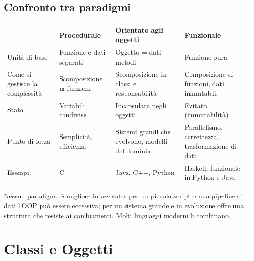 \subsection{Confronto tra paradigmi}
\begin{center}
\small
\begin{tabularx}{\textwidth}{@{}>{\raggedright\arraybackslash}p{2.4cm}XXX@{}}
\toprule
 & \textbf{Procedurale} & \textbf{Orientato agli oggetti} & \textbf{Funzionale} \\
\midrule
Unità di base & Funzione e dati separati & Oggetto = dati + metodi & Funzione pura \\
Come si gestisce la complessità & Scomposizione in funzioni & Scomposizione in classi e responsabilità & Composizione di funzioni, dati immutabili \\
Stato & Variabili condivise & Incapsulato negli oggetti & Evitato (immutabilità) \\
Punto di forza & Semplicità, efficienza & Sistemi grandi che evolvono, modelli del dominio & Parallelismo, correttezza, trasformazione di dati \\
Esempi & C & Java, C++, Python & Haskell, funzionale in Python e Java \\
\bottomrule
\end{tabularx}
\end{center}
Nessun paradigma è migliore in assoluto: per un piccolo script o una pipeline di dati l'OOP può essere eccessiva; per un sistema grande e in evoluzione offre una struttura che resiste ai cambiamenti. Molti linguaggi moderni li combinano.

\section{Classi e Oggetti}

